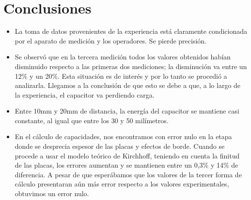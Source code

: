 \documentclass{article}
\begin{document}
\section{Conclusiones}
\begin{itemize}
	
	\item La toma de datos provenientes de la experiencia está claramente condicionada por 
	el aparato de medición y los operadores. Se pierde precisión.
    
    \item Se observó que en la tercera medición todos los valores obtenidos habían 
    disminuido respecto a las primeras dos mediciones; la disminución va entre un 12\% y un 
    20\%. Esta situación es de interés y por lo tanto se procedió a analizarla. Llegamos a 
    la conclusión de que esto se debe a que, a lo largo de la experiencia, el capacitor va 
    perdiendo carga.    
    
    \item Entre 10mm y 20mm de distancia, la energía del capacitor se mantiene casi 
    constante, al igual que entre los 30 y 50 milímetros.
    
    \item En el cálculo de capacidades, nos encontramos con error nulo en la etapa donde se 
    desprecia espesor de las placas y efectos de borde. Cuando se procede a usar el modelo 
    teórico de Kirchhoff, teniendo en cuenta la finitud de las placas, los errores aumentan y se mantienen entre un 0,3\% y 14\% de diferencia. A pesar de que esperábamos que los valores de la tercer forma de cálculo presentaran aún más error respecto a los valores experimentales, obtuvimos un error nulo.
    
\end{itemize}
\end{document}
